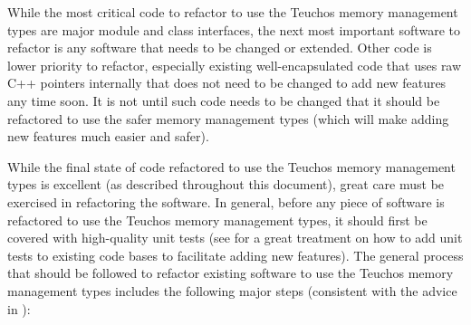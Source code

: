 \documentclass[pdf,ps2pdf,11pt]{SANDreport}
\begin{document}
While the most critical code to refactor to use the Teuchos memory
management types are major module and class interfaces, the next most
important software to refactor is any software that needs to be
changed or extended.  Other code is lower priority to refactor,
especially existing well-encapsulated code that uses raw C++ pointers
internally that does not need to be changed to add new features any
time soon.  It is not until such code needs to be changed that it
should be refactored to use the safer memory management types (which
will make adding new features much easier and safer).

While the final state of code refactored to use the Teuchos memory
management types is excellent (as described throughout this document),
great care must be exercised in refactoring the software.  In general,
before any piece of software is refactored to use the Teuchos memory
management types, it should first be covered with high-quality unit
tests (see {}\cite{WorkingEffectivelyWithLegacyCode05} for a great
treatment on how to add unit tests to existing code bases to
facilitate adding new features).  The general process that should be
followed to refactor existing software to use the Teuchos memory
management types includes the following major steps (consistent with
the advice in {}\cite{WorkingEffectivelyWithLegacyCode05}):
\end{document}
